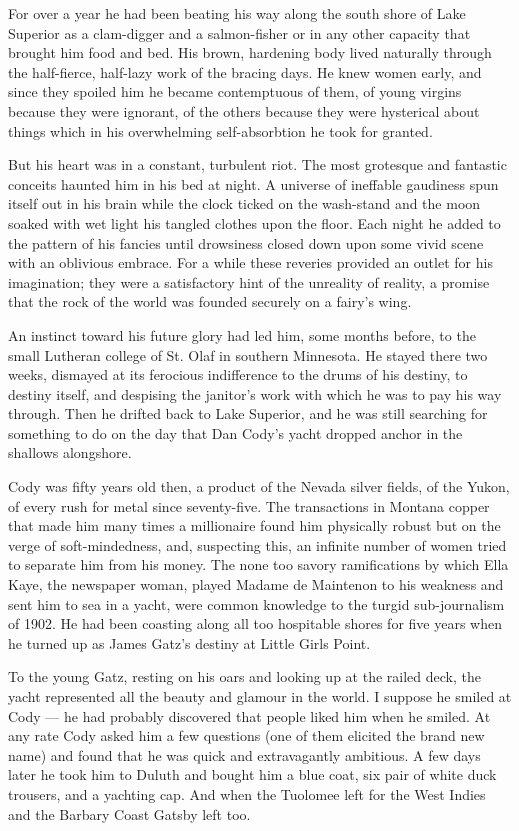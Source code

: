\documentclass{znotebook}
\begin{document}
For over a year he had been beating his way along the south shore of Lake Superior as a clam-digger and a salmon-fisher or in any other capacity that brought him food and bed. His brown, hardening body lived naturally through the half-fierce, half-lazy work of the bracing days. He knew women early, and since they spoiled him he became contemptuous of them, of young virgins because they were ignorant, of the others because they were hysterical about things which in his overwhelming self-absorbtion he took for granted.

But his heart was in a constant, turbulent riot. The most grotesque and fantastic conceits haunted him in his bed at night. A universe of ineffable gaudiness spun itself out in his brain while the clock ticked on the wash-stand and the moon soaked with wet light his tangled clothes upon the floor. Each night he added to the pattern of his fancies until drowsiness closed down upon some vivid scene with an oblivious embrace. For a while these reveries provided an outlet for his imagination; they were a satisfactory hint of the unreality of reality, a promise that the rock of the world was founded securely on a fairy's wing.

An instinct toward his future glory had led him, some months before, to the small Lutheran college of St. Olaf in southern Minnesota. He stayed there two weeks, dismayed at its ferocious indifference to the drums of his destiny, to destiny itself, and despising the janitor's work with which he was to pay his way through. Then he drifted back to Lake Superior, and he was still searching for something to do on the day that Dan Cody's yacht dropped anchor in the shallows alongshore.

Cody was fifty years old then, a product of the Nevada silver fields, of the Yukon, of every rush for metal since seventy-five. The transactions in Montana copper that made him many times a millionaire found him physically robust but on the verge of soft-mindedness, and, suspecting this, an infinite number of women tried to separate him from his money. The none too savory ramifications by which Ella Kaye, the newspaper woman, played Madame de Maintenon to his weakness and sent him to sea in a yacht, were common knowledge to the turgid sub-journalism of 1902. He had been coasting along all too hospitable shores for five years when he turned up as James Gatz's destiny at Little Girls Point.

To the young Gatz, resting on his oars and looking up at the railed deck, the yacht represented all the beauty and glamour in the world. I suppose he smiled at Cody ---{} he had probably discovered that people liked him when he smiled. At any rate Cody asked him a few questions (one of them elicited the brand new name) and found that he was quick and extravagantly ambitious. A few days later he took him to Duluth and bought him a blue coat, six pair of white duck trousers, and a yachting cap. And when the Tuolomee left for the West Indies and the Barbary Coast Gatsby left too.
\end{document}
